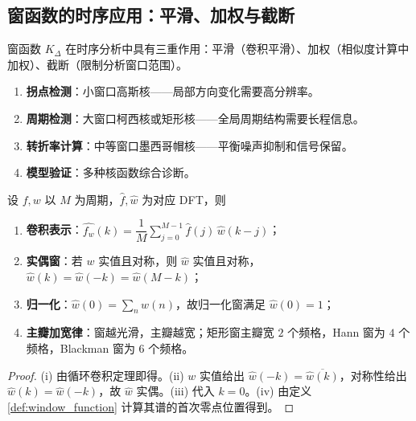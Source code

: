 \subsection{窗函数的时序应用：平滑、加权与截断}\label{sec:window_function_ts_app}
\begin{definition}[窗函数在时序分析中的三重作用]\label{def:ts_window_function}
窗函数 $K_\Delta$ 在时序分析中具有三重作用：平滑（卷积平滑）、加权（相似度计算中加权）、截断（限制分析窗口范围）。
\end{definition}

\begin{proposition}[窗函数的选择原则]\label{prop:ts_window_selection}
\begin{enumerate}[label=(\roman*)]
    \item \textbf{拐点检测}：小窗口高斯核——局部方向变化需要高分辨率。
    \item \textbf{周期检测}：大窗口柯西核或矩形核——全局周期结构需要长程信息。
    \item \textbf{转折率计算}：中等窗口墨西哥帽核——平衡噪声抑制和信号保留。
    \item \textbf{模型验证}：多种核函数综合诊断。
\end{enumerate}
\end{proposition}
\begin{proposition}[加窗谱的卷积表示与基本性质]\label{prop:window_spectrum_properties_parallel}
设 $f,w$ 以 $M$ 为周期，$\hat f,\hat w$ 为对应 DFT，则
\begin{enumerate}[label=(\roman*)]
    \item \textbf{卷积表示}：$\widehat{f_w}(k)=\dfrac1M\displaystyle\sum_{j=0}^{M-1}\hat f(j)\,\hat w(k-j)$；
    \item \textbf{实偶窗}：若 $w$ 实值且对称，则 $\hat w$ 实值且对称，$\hat w(k)=\hat w(-k)=\hat w(M-k)$；
    \item \textbf{归一化}：$\hat w(0)=\sum_{n}w(n)$，故归一化窗满足 $\hat w(0)=1$；
    \item \textbf{主瓣加宽律}：窗越光滑，主瓣越宽；矩形窗主瓣宽 $2$ 个频格，Hann 窗为 $4$ 个频格，Blackman 窗为 $6$ 个频格。
\end{enumerate}
\end{proposition}

\begin{proof}
(i) 由循环卷积定理即得。(ii) $w$ 实值给出 $\hat w(-k)=\overline{\hat w(k)}$，对称性给出 $\hat w(k)=\hat w(-k)$，故 $\hat w$ 实偶。(iii) 代入 $k=0$。(iv) 由定义 \ref{def:window_function} 计算其谱的首次零点位置得到。
\end{proof}

